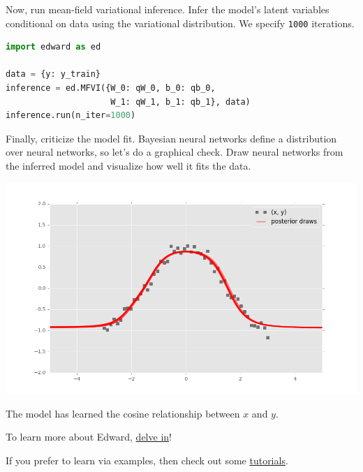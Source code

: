 Now, run mean-field variational inference. Infer the model's latent variables
conditional on data using the variational distribution.
We specify \texttt{1000} iterations.
\begin{lstlisting}[language=Python]
import edward as ed

data = {y: y_train}
inference = ed.MFVI({W_0: qW_0, b_0: qb_0,
                     W_1: qW_1, b_1: qb_1}, data)
inference.run(n_iter=1000)
\end{lstlisting}

Finally, criticize the model fit. Bayesian neural networks define a
distribution over neural networks, so let's do a graphical check. Draw
neural networks from the inferred model and visualize how well it
fits the data.

\includegraphics[width=700px]{images/getting-started-fig1.png}

The model has learned the cosine relationship between $x$ and $y$.

To learn more about Edward, \href{delving-in}{delve in}!

If you prefer to learn via examples, then check out some
\href{tutorials}{tutorials}.
